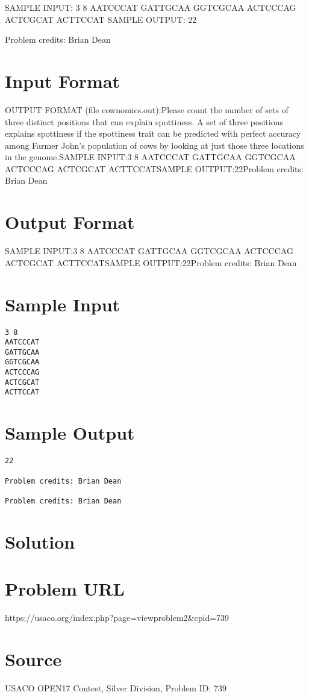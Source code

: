 \documentclass[12pt]{article}
\begin{document}
SAMPLE INPUT:
3 8
AATCCCAT
GATTGCAA
GGTCGCAA
ACTCCCAG
ACTCGCAT
ACTTCCAT
SAMPLE OUTPUT: 
22


Problem credits: Brian Dean



\section*{Input Format}
OUTPUT FORMAT (file cownomics.out):Please count the number of sets of three distinct positions that can explain
spottiness.  A set of three positions explains spottiness if the spottiness
trait can be predicted with perfect accuracy among Farmer John's population of
cows by looking at just those three locations in the genome.SAMPLE INPUT:3 8
AATCCCAT
GATTGCAA
GGTCGCAA
ACTCCCAG
ACTCGCAT
ACTTCCATSAMPLE OUTPUT:22Problem credits: Brian Dean

\section*{Output Format}
SAMPLE INPUT:3 8
AATCCCAT
GATTGCAA
GGTCGCAA
ACTCCCAG
ACTCGCAT
ACTTCCATSAMPLE OUTPUT:22Problem credits: Brian Dean

\section*{Sample Input}
\begin{verbatim}
3 8
AATCCCAT
GATTGCAA
GGTCGCAA
ACTCCCAG
ACTCGCAT
ACTTCCAT
\end{verbatim}

\section*{Sample Output}
\begin{verbatim}
22

Problem credits: Brian Dean

Problem credits: Brian Dean
\end{verbatim}

\section*{Solution}


\section*{Problem URL}
https://usaco.org/index.php?page=viewproblem2&cpid=739

\section*{Source}
USACO OPEN17 Contest, Silver Division, Problem ID: 739
\end{document}
